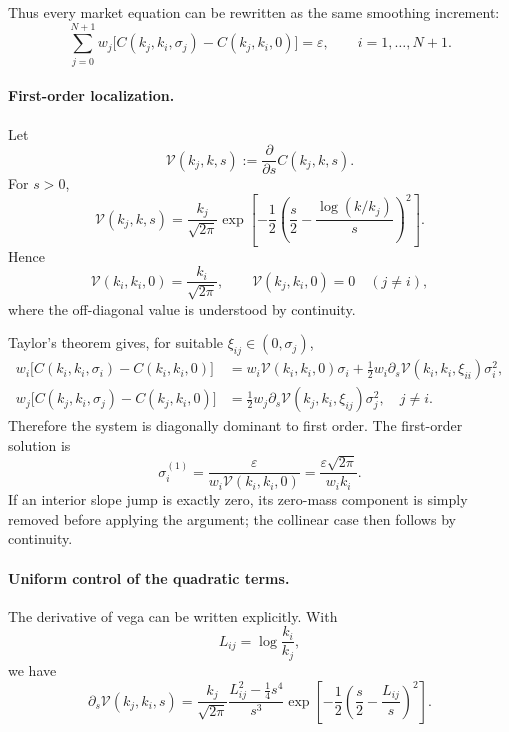 \documentclass[11pt]{article}
\newcommand{\eps}{\varepsilon}
\newcommand{\Vega}{\mathcal{V}}
\begin{document}
Thus every market equation can be rewritten as the same smoothing increment:
\begin{equation}
\sum_{j=0}^{N+1}w_j
\bigl[C(k_j,k_i,\sigma_j)-C(k_j,k_i,0)\bigr]
=\eps,
\qquad i=1,\ldots,N+1.
\label{eq:system}
\end{equation}

\paragraph{First-order localization.}
Let
\[
\Vega(k_j,k,s):=\frac{\partial}{\partial s}C(k_j,k,s).
\]
For $s>0$,
\begin{equation}
\Vega(k_j,k,s)
=\frac{k_j}{\sqrt{2\pi}}
\exp\!\left[-\frac12\left(\frac{s}{2}-\frac{\log(k/k_j)}{s}\right)^2\right].
\label{eq:vega}
\end{equation}
Hence
\begin{equation}
\Vega(k_i,k_i,0)=\frac{k_i}{\sqrt{2\pi}},
\qquad
\Vega(k_j,k_i,0)=0\quad(j\ne i),
\label{eq:vegazero}
\end{equation}
where the off-diagonal value is understood by continuity.

Taylor's theorem gives, for suitable $\xi_{ij}\in(0,\sigma_j)$,
\begin{align}
w_i\bigl[C(k_i,k_i,\sigma_i)-C(k_i,k_i,0)\bigr]
&=w_i\Vega(k_i,k_i,0)\sigma_i
+\frac12w_i\partial_s\Vega(k_i,k_i,\xi_{ii})\sigma_i^2,
\label{eq:taylor-diag}\\
w_j\bigl[C(k_j,k_i,\sigma_j)-C(k_j,k_i,0)\bigr]
&=\frac12w_j\partial_s\Vega(k_j,k_i,\xi_{ij})\sigma_j^2,
\quad j\ne i.
\label{eq:taylor-off}
\end{align}
Therefore the system is diagonally dominant to first order. The first-order solution is
\begin{equation}
\sigma_i^{(1)}
=\frac{\eps}{w_i\Vega(k_i,k_i,0)}
=\frac{\eps\sqrt{2\pi}}{w_i k_i}.
\label{eq:firstorder}
\end{equation}
If an interior slope jump is exactly zero, its zero-mass component is simply removed before applying the argument; the collinear case then follows by continuity.

\paragraph{Uniform control of the quadratic terms.}
The derivative of vega can be written explicitly. With
\[
L_{ij}=\log\frac{k_i}{k_j},
\]
we have
\begin{equation}
\partial_s\Vega(k_j,k_i,s)
=\frac{k_j}{\sqrt{2\pi}}
\frac{L_{ij}^2-\frac14s^4}{s^3}
\exp\!\left[-\frac12\left(\frac{s}{2}-\frac{L_{ij}}{s}\right)^2\right].
\label{eq:vomma}
\end{equation}
\end{document}
